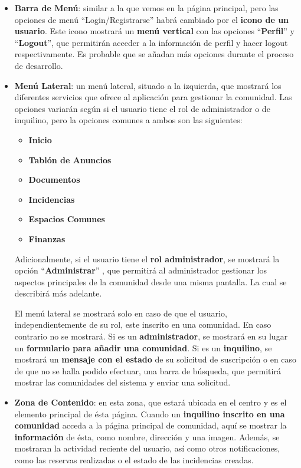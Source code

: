 \begin{appendices}
\begin{itemize}
	\begin{itemize}
		\item \textbf{Barra de Menú}: similar a la que vemos en la página principal, pero las opciones de menú ``Login/Registrarse''  habrá cambiado por el \textbf{icono de un usuario}. Este icono mostrará un \textbf{menú vertical} con las opciones ``\textbf{Perfil}'' y ``\textbf{Logout}'', que permitirán acceder a la información de perfil y hacer \gls{logout} respectivamente. Es probable que se añadan más opciones durante el proceso de desarrollo.
		
		\item \textbf{Menú Lateral}: un menú lateral, situado a la izquierda, que mostrará los diferentes servicios que ofrece al aplicación para gestionar la comunidad. Las opciones variarán según si el usuario tiene el rol de administrador o de inquilino, pero la opciones comunes a ambos son las siguientes: 
		
		\begin{itemize}
			\item \textbf{Inicio}
			\item \textbf{Tablón de Anuncios}
			\item \textbf{Documentos}
			\item \textbf{Incidencias}
			\item \textbf{Espacios Comunes}
			\item \textbf{Finanzas}
		\end{itemize}
	
		 
		 Adicionalmente, si el usuario tiene el \textbf{rol administrador}, se mostrará la opción ``\textbf{Administrar}''	, que permitirá al administrador gestionar los aspectos principales de la comunidad desde una misma pantalla. La cual se describirá más adelante.
		 
		El menú lateral se mostrará solo en caso de que el usuario, independientemente de su rol, este inscrito en una comunidad. En caso contrario no se mostrará. Si es un \textbf{administrador}, se mostrará en su lugar un \textbf{formulario para añadir una comunidad}. Si es un \textbf{inquilino}, se mostrará un \textbf{mensaje con el estado} de su solicitud de suscripción o en caso de que no se halla podido efectuar, una barra de búsqueda, que permitirá mostrar las comunidades del sistema y enviar una solicitud.
		
		\item \textbf{Zona de Contenido}: en esta zona, que estará ubicada en el centro y es el elemento principal de ésta página. Cuando un \textbf{inquilino inscrito en una comunidad} acceda a la página principal de comunidad, aquí se mostrar la \textbf{información} de ésta, como nombre, dirección y una imagen. Además, se mostraran la actividad reciente del usuario, así como otros notificaciones, como las reservas realizadas o el estado de las incidencias creadas.
		

\end{itemize}
\end{itemize}
\end{appendices}
